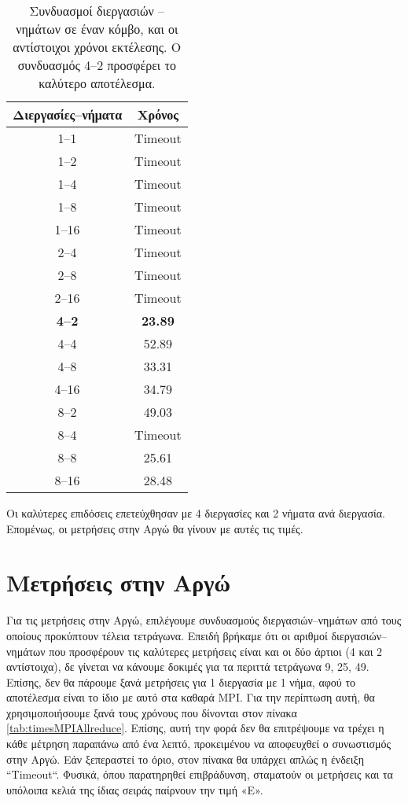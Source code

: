 \begin{table}[H]
\centering
\begin{tabular}{| c | c | }
\hline
Διεργασίες--νήματα & Χρόνος \\
\hline
1--1 & Timeout \\
1--2 & Timeout \\
1--4 & Timeout \\
1--8 & Timeout \\
1--16 & Timeout \\
2--4 & Timeout \\
2--8 & Timeout \\
2--16 & Timeout \\
\textbf{4--2} & \textbf{23.89} \\
4--4 & 52.89 \\
4--8 & 33.31 \\
4--16 & 34.79 \\
8--2 & 49.03 \\
8--4 & Timeout \\
8--8 & 25.61 \\
8--16 & 28.48 \\
\hline
\end{tabular}
\caption{Συνδυασμοί διεργασιών -- νημάτων σε έναν κόμβο, και οι αντίστοιχοι χρόνοι εκτέλεσης. Ο συνδυασμός 4--2 προσφέρει το καλύτερο αποτέλεσμα.}
\label{tab:OpenMPOneNode}
\end{table}

Οι καλύτερες επιδόσεις επετεύχθησαν με 4 διεργασίες και 2 νήματα ανά διεργασία. Επομένως, οι μετρήσεις στην Αργώ θα γίνουν με αυτές τις τιμές.

\section{Μετρήσεις στην Αργώ}
\begin{multicols}{2}
Για τις μετρήσεις στην Αργώ, επιλέγουμε συνδυασμούς διεργασιών--νημάτων από τους οποίους προκύπτουν τέλεια τετράγωνα. Επειδή βρήκαμε ότι οι αριθμοί διεργασιών--νημάτων που προσφέρουν τις καλύτερες μετρήσεις είναι και οι δύο άρτιοι (4 και 2 αντίστοιχα), δε γίνεται να κάνουμε δοκιμές για τα περιττά τετράγωνα 9, 25, 49. Επίσης, δεν θα πάρουμε ξανά μετρήσεις για 1 διεργασία με 1 νήμα, αφού το αποτέλεσμα είναι το ίδιο με αυτό στα καθαρά MPI. Για την περίπτωση αυτή, θα χρησιμοποιήσουμε ξανά τους χρόνους που δίνονται στον πίνακα \ref{tab:timesMPIAllreduce}. Επίσης, αυτή την φορά δεν θα επιτρέψουμε να τρέχει η κάθε μέτρηση παραπάνω από ένα λεπτό, προκειμένου να αποφευχθεί ο συνωστισμός στην Αργώ. Εάν ξεπεραστεί το όριο, στον πίνακα θα υπάρχει απλώς η ένδειξη ``Timeout``. Φυσικά, όπου παρατηρηθεί επιβράδυνση, σταματούν οι μετρήσεις και τα υπόλοιπα κελιά της ίδιας σειράς παίρνουν την τιμή «Ε».
\end{multicols}


